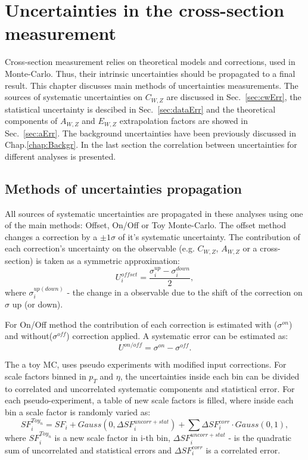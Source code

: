 \chapter{Uncertainties in the cross-section measurement}\label{chap:Unc}
\minitoc
Cross-section measurement relies on theoretical models and corrections, used in Monte-Carlo. Thus, their intrinsic uncertainties should be propagated to a final result. This chapter discusses main methods of uncertainties measurements. The sources of systematic uncertainties on $C_{W,Z}$ are discussed in Sec.~\ref{sec:cwErr}, the statistical uncertainty is descibed in Sec.~\ref{sec:dataErr} and the theoretical components of  $A_{W,Z}$ and $E_{W,Z}$ extrapolation factors are showed in Sec.~\ref{sec:aErr}. The background uncertainties have been previously discussed in Chap.\ref{chap:Backgr}. In the last section the correlation between uncertainties for different analyses is presented.

\section{Methods of uncertainties propagation}
All sources of systematic uncertainties are propagated in these analyses using one of the main methods: Offset, On/Off or Toy Monte-Carlo. The offset method changes a correction by a $\pm 1\sigma$ of it's systematic uncertainty. The contribution of each correction's uncertainty on the observable (e.g. $C_{W,Z}$, $A_{W,Z}$ or a cross-section) is taken as a symmetric approximation:
\begin{equation}
U_i^{offset}=\frac{\sigma_{i}^{up}-\sigma_{i}^{down}}{2},
\end{equation}
where $\sigma_{i}^{up(down)}$ - the change in a observable due to the shift of the correction on $\sigma$ up (or down). 

For On/Off method the contribution of each correction is estimated with ($\sigma^{on}$) and without($\sigma^{off}$) correction applied. A systematic error can be estimated as:
\begin{equation}
U^{on/off}=\sigma^{on}-\sigma^{off}.
\end{equation}

The a toy MC\cite{ToyMC}, uses pseudo experiments with modified input corrections. For scale factors binned in $p_T$ and $\eta$, the uncertainties inside each bin can be divided to correlated  and uncorrelated systematic components and statistical error. For each pseudo-experiment, a table of new scale factors is filled, where inside each bin a scale factor is randomly varied as:
\begin{equation}\label{eq:ToyMethod}
SF_{i}^{Toy_{n}} = SF_{i}+ Gauss(0,\Delta SF_{i} ^{uncorr+stat}) + \sum \Delta SF_{i} ^{corr} \cdot Gauss(0, 1),
\end{equation}
where $SF_{i}^{Toy_{n}}$ is a new scale factor in i-th bin, $\Delta SF_{i} ^{uncorr+stat}$ - is the quadratic sum of uncorrelated and statistical errors and $\Delta SF_{i} ^{corr}$ is a correlated error.

